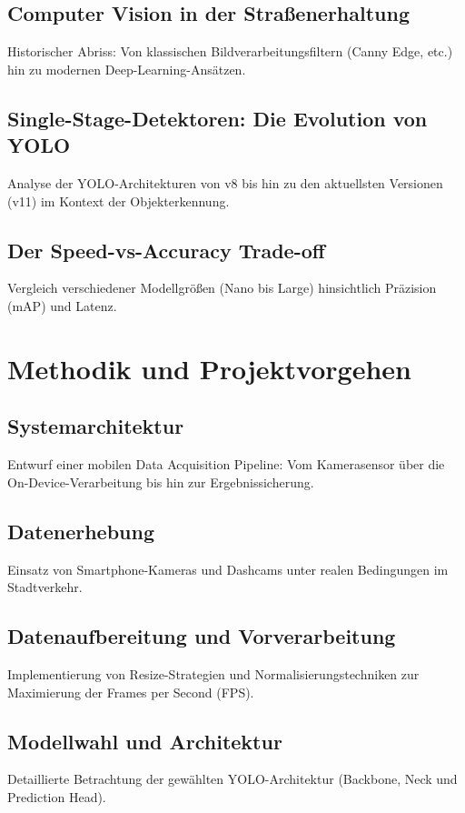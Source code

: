 \documentclass[fontsize=13pt,a4paper, listof=entryprefix, bibliography=totocnumbered,toc=listofnumbered]{scrartcl}
\begin{document}
\subsection{Computer Vision in der Straßenerhaltung}
Historischer Abriss: Von klassischen Bildverarbeitungsfiltern (Canny Edge, etc.) hin zu modernen Deep-Learning-Ansätzen.

\subsection{Single-Stage-Detektoren: Die Evolution von YOLO}
Analyse der YOLO-Architekturen von v8 bis hin zu den aktuellsten Versionen (v11) im Kontext der Objekterkennung.

\subsection{Der Speed-vs-Accuracy Trade-off}
Vergleich verschiedener Modellgrößen (Nano bis Large) hinsichtlich Präzision (mAP) und Latenz.

\section{Methodik und Projektvorgehen}
\label{sec:methodik}

\subsection{Systemarchitektur}
Entwurf einer mobilen Data Acquisition Pipeline: Vom Kamerasensor über die On-Device-Verarbeitung bis hin zur Ergebnissicherung.

\subsection{Datenerhebung}
Einsatz von Smartphone-Kameras und Dashcams unter realen Bedingungen im Stadtverkehr.

\subsection{Datenaufbereitung und Vorverarbeitung}
Implementierung von Resize-Strategien und Normalisierungstechniken zur Maximierung der Frames per Second (FPS).

\subsection{Modellwahl und Architektur}
Detaillierte Betrachtung der gewählten YOLO-Architektur (Backbone, Neck und Prediction Head).
\end{document}
